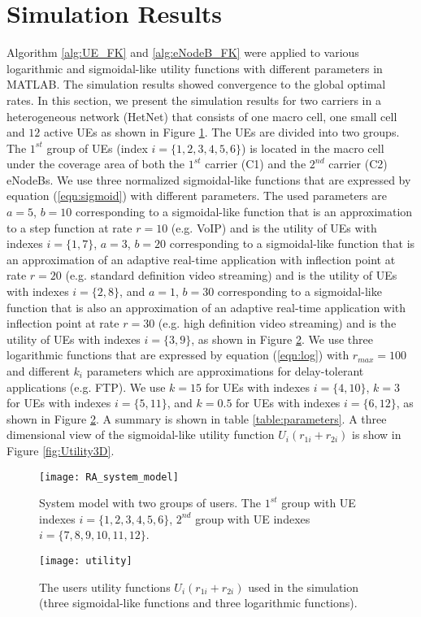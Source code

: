 \documentclass[journal]{IEEEtran} 		\usepackage{amsmath,amssymb}
\begin{document}
\section{Simulation Results}\label{sec:sim}

Algorithm \ref{alg:UE_FK} and \ref{alg:eNodeB_FK} were applied to various logarithmic and sigmoidal-like utility functions with different parameters in MATLAB. The simulation results showed convergence to the global optimal rates. In this section, we present the simulation results for two carriers in a heterogeneous network (HetNet) that consists of one macro cell, one small cell and $12$ active UEs as shown in Figure \ref{fig:RA_system_model}. The UEs are divided into two groups. The $1^{st}$ group of UEs (index $i=\{1,2,3,4,5,6\}$) is located in the macro cell under the coverage area of both the $1^{st}$ carrier (C1) and the $2^{nd}$ carrier (C2) eNodeBs. We use three normalized sigmoidal-like functions that are expressed by equation (\ref{eqn:sigmoid}) with different parameters. The used parameters are $a = 5$, $b=10$ corresponding to a sigmoidal-like function that is an approximation to a step function at rate $r =10$ (e.g. VoIP) and is the utility of UEs with indexes $i=\{1,7\}$, $a = 3$, $b=20$
corresponding to a sigmoidal-like function that is an approximation of an adaptive real-time application with inflection point at rate $r=20$ (e.g. standard definition video streaming) and is the utility of UEs with indexes $i=\{2,8\}$, and $a = 1$,  $b=30$ corresponding to a sigmoidal-like function that is also an approximation of an adaptive real-time application with inflection point at rate $r=30$ (e.g. high definition video streaming) and is the utility of UEs with indexes $i=\{3,9\}$, as shown in Figure \ref{fig:utility}. We use three logarithmic functions that are expressed by equation (\ref{eqn:log}) with $r_{max} =100$ and different $k_i$ parameters which are approximations for delay-tolerant applications (e.g. FTP). We use $k =15$ for UEs with indexes $i=\{4,10\}$, $k =3$ for UEs with indexes $i=\{5,11\}$, and $k = 0.5$ for UEs with indexes $i=\{6,12\}$, as shown in Figure \ref{fig:utility}. A summary is shown in table \ref{table:parameters}. A three dimensional view of the sigmoidal-like utility
function $U_i(r_{1i} +r_{2i})$ is show in Figure \ref{fig:Utility3D}.
\begin{figure}[tb]
\centering
\texttt{[image: RA\_system\_model]}
\caption{System model with two groups of users. The $1^{st}$ group with UE indexes $i =\{ 1,2,3,4,5,6\}$, $2^{nd}$ group with UE indexes $i = \{7,8,9,10,11,12\}$.}
\label{fig:RA_system_model}
\end{figure}
\begin{figure}[tb]
\centering
\texttt{[image: utility]}
\caption{The users utility functions $U_i(r_{1i}+r_{2i})$ used in the simulation (three sigmoidal-like functions and three logarithmic functions).}
\label{fig:utility}
\end{figure}
\end{document}
